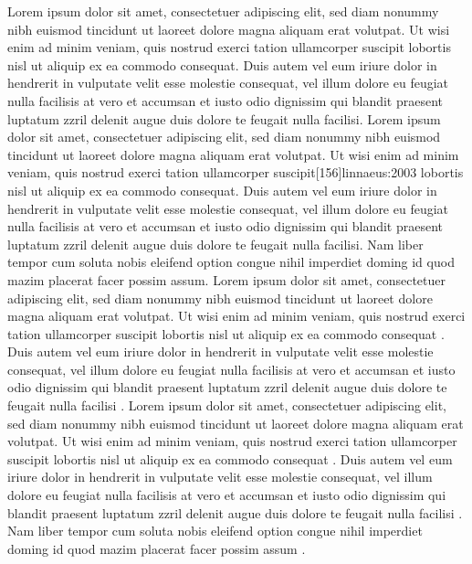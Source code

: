 \documentclass[a4paper,12pt]{scrartcl}
\begin{document}
    {
        {Lorem ipsum dolor sit amet, consectetuer adipiscing elit, sed diam nonummy nibh euismod tincidunt ut laoreet dolore magna aliquam erat volutpat. Ut wisi enim ad minim veniam, quis nostrud exerci tation ullamcorper suscipit lobortis nisl ut aliquip ex ea commodo consequat.\autocite{auler:hiller:2015} Duis autem vel eum iriure dolor in hendrerit in vulputate velit esse molestie consequat, vel illum dolore eu feugiat nulla facilisis at vero et accumsan et iusto odio dignissim qui blandit praesent luptatum zzril delenit augue duis dolore te feugait nulla facilisi.\autocites[68]{auler:hiller:2011}[48]{auler:hiller:2015a}[159--187]{auler:hiller:2015}[40--41]{auler:hiller:2016}[15--23]{tacitus:1981}[19]{de:neck:yoder:1978}[69]{auler:hiller:2011} Lorem ipsum dolor sit amet, consectetuer adipiscing elit, sed diam nonummy nibh euismod tincidunt ut laoreet dolore magna aliquam erat volutpat. Ut wisi enim ad minim veniam, quis nostrud exerci tation ullamcorper suscipit[156]{linnaeus:2003} lobortis nisl ut aliquip ex ea commodo consequat.\autocite{kenmore} Duis autem vel eum iriure dolor in hendrerit in vulputate velit esse molestie consequat, vel illum dolore eu feugiat nulla facilisis at vero et accumsan et iusto odio dignissim qui blandit praesent luptatum zzril delenit augue duis dolore te feugait nulla facilisi.\autocite{kenmore} Nam liber tempor cum soluta nobis eleifend\autocite[41--43]{auler:hiller:2015} option congue nihil imperdiet\autocite[19]{de:neck:yoder:1978} doming id quod mazim placerat facer possim assum.\autocite[145--146]{todorova:et:al:1981}}
        {
            {Lorem ipsum dolor sit amet, consectetuer adipiscing elit, sed diam nonummy nibh euismod tincidunt ut laoreet dolore magna aliquam erat volutpat. Ut wisi enim ad minim veniam, quis nostrud exerci tation ullamcorper suscipit lobortis nisl ut aliquip ex ea commodo consequat \autocite{auler:hiller:2015}. Duis autem vel eum iriure dolor in hendrerit in vulputate velit esse molestie consequat, vel illum dolore eu feugiat nulla facilisis at vero et accumsan et iusto odio dignissim qui blandit praesent luptatum zzril delenit augue duis dolore te feugait nulla facilisi \autocite{auler:hiller:2011,auler:hiller:2015a,auler:hiller:2015,auler:hiller:2016,tacitus:1981,de:neck:yoder:1978}. Lorem ipsum dolor sit amet, consectetuer adipiscing elit, sed diam nonummy nibh euismod tincidunt ut laoreet dolore magna aliquam erat volutpat. Ut wisi enim ad minim veniam, quis nostrud exerci tation ullamcorper suscipit  lobortis nisl ut aliquip ex ea commodo consequat \autocite{kenmore}. Duis autem vel eum iriure dolor in hendrerit in vulputate velit esse molestie consequat, vel illum dolore eu feugiat nulla facilisis at vero et accumsan et iusto odio dignissim qui blandit praesent luptatum zzril delenit augue duis dolore te feugait nulla facilisi \autocite{kenmore}. Nam liber tempor cum soluta nobis eleifend option congue nihil imperdiet doming id quod mazim placerat facer possim assum \autocite{todorova:et:al:1981}.}
            {}%
        }%
    }%
\end{document}
